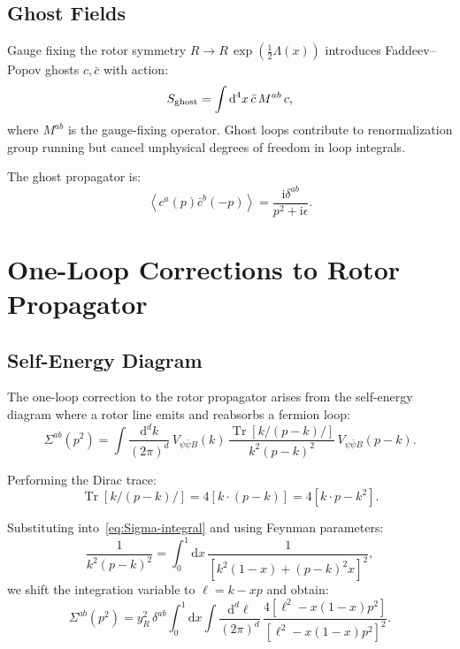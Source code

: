 \documentclass[11pt,a4paper]{article}
\numberwithin{equation}{section}
\theoremstyle{plain}
\theoremstyle{definition}
\theoremstyle{remark}
\DeclareMathOperator{\Tr}{Tr}
\newcommand{\dd}{\mathrm{d}}
\newcommand{\ii}{\mathrm{i}}
\newcommand{\avg}[1]{\left\langle #1 \right\rangle}
\begin{document}
\subsection{Ghost Fields}

Gauge fixing the rotor symmetry $R\to R\,\exp(\tfrac12\Lambda(x))$ introduces Faddeev--Popov ghosts $c,\bar c$ with action:
\begin{equation}
S_{\rm ghost} = \int \dd^4x\,\bar c\,M^{ab}\,c,
\label{eq:S-ghost}
\end{equation}
where $M^{ab}$ is the gauge-fixing operator. Ghost loops contribute to renormalization group running but cancel unphysical degrees of freedom in loop integrals.

The ghost propagator is:
\begin{equation}
\avg{c^a(p)\bar c^b(-p)} = \frac{\ii\delta^{ab}}{p^2+\ii\epsilon}.
\label{eq:prop-ghost}
\end{equation}

\vspace{1em}

\section{One-Loop Corrections to Rotor Propagator}\label{sec:oneloop}

\subsection{Self-Energy Diagram}

The one-loop correction to the rotor propagator arises from the self-energy diagram where a rotor line emits and reabsorbs a fermion loop:
\begin{equation}
\Sigma^{ab}(p^2) = \int \frac{\dd^d k}{(2\pi)^d}\,V_{\psi\bar\psi B}(k)\,\frac{\Tr[k\!\!\!/(p-k)\!\!\!/]}{k^2(p-k)^2}\,V_{\psi\bar\psi B}(p-k).
\label{eq:Sigma-integral}
\end{equation}

Performing the Dirac trace:
\begin{equation}
\Tr[k\!\!\!/(p-k)\!\!\!/] = 4[k\cdot(p-k)] = 4[k\cdot p - k^2].
\label{eq:trace-dirac}
\end{equation}

Substituting into~\eqref{eq:Sigma-integral} and using Feynman parameters:
\begin{equation}
\frac{1}{k^2(p-k)^2} = \int_0^1 \dd x\,\frac{1}{[k^2(1-x)+(p-k)^2 x]^2},
\label{eq:feynman-param}
\end{equation}
we shift the integration variable to $\ell = k - xp$ and obtain:
\begin{equation}
\Sigma^{ab}(p^2) = y_R^2\,\delta^{ab}\int_0^1 \dd x\int \frac{\dd^d \ell}{(2\pi)^d}\,\frac{4[\ell^2 - x(1-x)p^2]}{[\ell^2 - x(1-x)p^2]^2}.
\label{eq:Sigma-feynman}
\end{equation}
\end{document}
